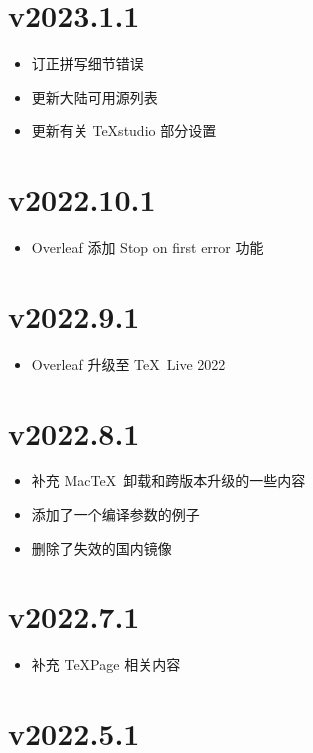 \section*{v2023.1.1}

\begin{itemize}
  \item 订正拼写细节错误
  \item 更新大陆可用源列表
  \item 更新有关 \TeX studio 部分设置
\end{itemize}

\section*{v2022.10.1}

\begin{itemize}
  \item Overleaf 添加 Stop on first error 功能
\end{itemize}

\section*{v2022.9.1}

\begin{itemize}
  \item Overleaf 升级至 \TeX\ Live 2022
\end{itemize}

\section*{v2022.8.1}

\begin{itemize}
  \item 补充 Mac\TeX\ 卸载和跨版本升级的一些内容
  \item 添加了一个编译参数的例子
  \item 删除了失效的国内镜像
\end{itemize}

\section*{v2022.7.1}

\begin{itemize}
  \item 补充 TeXPage 相关内容
\end{itemize}

\section*{v2022.5.1}

